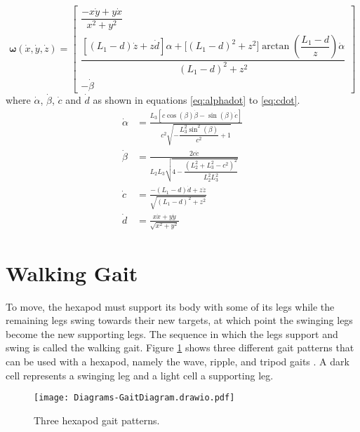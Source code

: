             \begin{equation}\label{eq:rate}
                \bm{\omega}(\dot{x}, \dot{y}, \dot{z}) =
                                    \begin{bmatrix}
                                        \dfrac{- x\dot{y} + y \dot{x}}{x^2 + y^2}\\[0.5cm]
                                        \dfrac{\left[(L_1 - d)\dot{z} + z\dot{d}\right]\alpha + \Big[(L_1 - d)^2 + z^2\Big]\arctan{\left(\dfrac{L_1-d}{z}\right)}\dot{\alpha}}{(L_1 - d)^2 + z^2}\\[0.8cm]
                                        -\dot{\beta} 
                                    \end{bmatrix}
            \end{equation}
            where \(\dot\alpha\), \(\dot\beta\), \(\dot{c}\) and \(\dot{d}\) as shown in equations \ref{eq:alphadot} to \ref{eq:cdot}.
            \begin{align}
                \dot{\alpha} &= \frac{ L_3\left[ c\cos(\beta)\dot{\beta} - \sin(\beta)\dot{c} \right] }{ c^2\sqrt{-\dfrac{L_3^2\sin^2(\beta)}{c^2}+1} } \label{eq:alphadot} \\[0.5cm] 
                \dot{\beta} &= \frac{ 2c\dot{c} }{ L_2L_3\sqrt{4 - \dfrac{(L_2^2+L_3^2-c^2)^2}{L_2^2L_3^2}} } \label{eq:betadot} \\[0.5cm]
                \dot{c} &= \frac{-(L_1 - d)\dot{d} + z\dot{z}}{\sqrt{(L_1 - d)^2 + z^2}} \label{eq:bdot} \\[0.5cm]
                \dot{d} &= \frac{x\dot{x} + y\dot{y}}{\sqrt{x^2 + y^2}} \label{eq:cdot}
            \end{align}
    
    \newpage
    \section{Walking Gait}
        To move, the hexapod must support its body with some of its legs while the remaining legs swing towards their new targets, at which point the swinging legs become the new supporting legs. The sequence in which the legs support and swing is called the walking gait. Figure \ref{fig:gait_patterns} shows three different gait patterns that can be used with a hexapod, namely the wave, ripple, and tripod gaits \citep{Darbha2017AnOS}. A dark cell represents a swinging leg and a light cell a supporting leg.
        \begin{figure}[h]
            \centering
            \texttt{[image: Diagrams-GaitDiagram.drawio.pdf]}
            \caption{Three hexapod gait patterns.}
            \label{fig:gait_patterns}
        \end{figure}

